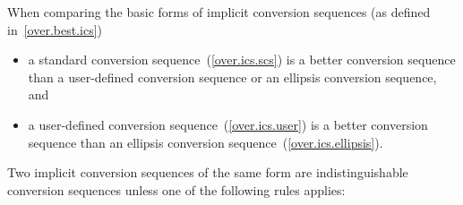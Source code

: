\pnum
When comparing the basic forms of implicit conversion sequences
(as defined in~\ref{over.best.ics})

\begin{itemize}
\item
a standard conversion sequence~(\ref{over.ics.scs}) is a better
conversion sequence than a user-defined conversion sequence
or an ellipsis conversion sequence, and
\item
a user-defined conversion sequence~(\ref{over.ics.user}) is a
better conversion sequence than an ellipsis conversion
sequence~(\ref{over.ics.ellipsis}).
\end{itemize}

\pnum
Two implicit conversion sequences of the same form are
indistinguishable conversion sequences unless one of the
following rules applies:


